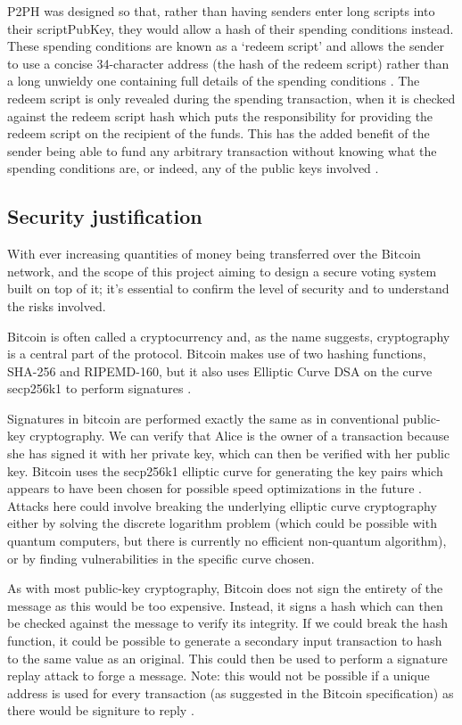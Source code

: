 \documentclass{article}
\begin{document}
P2PH was designed so that, rather than having senders enter long scripts into their scriptPubKey, they would allow a hash of their spending conditions instead. These spending conditions are known as a `redeem script' and allows the sender to use a concise 34-character address (the hash of the redeem script) rather than a long unwieldy one containing full details of the spending conditions \citep{39_pour_2014}. The redeem script is only revealed during the spending transaction, when it is checked against the redeem script hash which puts the responsibility for providing the redeem script on the recipient of the funds. This has the added benefit of the sender being able to fund any arbitrary transaction without knowing what the spending conditions are, or indeed, any of the public keys involved \citep{39_pour_2014}.

\subsection{Security justification}
With ever increasing quantities of money being transferred over the Bitcoin network, and the scope of this project aiming to design a secure voting system built on top of it; it's essential to confirm the level of security and to understand the risks involved.

Bitcoin is often called a cryptocurrency and, as the name suggests, cryptography is a central part of the protocol. Bitcoin makes use of two hashing functions, SHA-256 and RIPEMD-160, but it also uses Elliptic Curve DSA on the curve secp256k1 to perform signatures \citep{41_yang_2011}.

Signatures in bitcoin are performed exactly the same as in conventional public-key cryptography. We can verify that Alice is the owner of a transaction because she has signed it with her private key, which can then be verified with her public key. Bitcoin uses the secp256k1 elliptic curve for generating the key pairs which appears to have been chosen for possible speed optimizations in the future \citep{41_yang_2011}. Attacks here could involve breaking the underlying elliptic curve cryptography either by solving the discrete logarithm problem (which could be possible with quantum computers, but there is currently no efficient non-quantum algorithm), or by finding vulnerabilities in the specific curve chosen.

As with most public-key cryptography, Bitcoin does not sign the entirety of the message as this would be too expensive. Instead, it signs a hash which can then be checked against the message to verify its integrity. If we could break the hash function, it could be possible to generate a secondary input transaction to hash to the same value as an original. This could then be used to perform a signature replay attack to forge a message. Note: this would not be possible if a unique address is used for every transaction (as suggested in the Bitcoin specification) as there would be signiture to reply \citep{41_yang_2011}.
\end{document}
